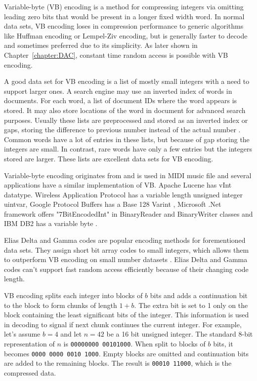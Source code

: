 Variable-byte (VB) encoding \citep{Wil99} is a method for compressing integers via omitting leading zero bits that would be present in a longer fixed 
width word. In normal data sets, VB encoding loses in compression performance to generic algorithms like Huffman encoding or Lempel-Ziv encoding, but 
is generally faster to decode \citep{Bri09} and sometimes preferred due to its simplicity. As later shown in Chapter~\ref{chapter:DAC}, constant time 
random access is possible with VB encoding.

A good data set for VB encoding is a list of mostly small integers with a need to support larger ones. A search engine may use an inverted index of 
words in documents. For each word, a list of document IDs where the word appears is stored. It may also store locations of the word in document for 
advanced search purposes. Usually these lists are preprocessed and stored as an inverted index or gaps, storing the difference to previous number 
instead of the actual number \citep{Man08}. Common words have a lot of entries in these lists, but because of gap storing the integers are small. 
In contrast, rare words have only a few entries but the integers stored are larger. These lists are excellent data sets for VB encoding. 

Variable-byte encoding originates from and is used in MIDI music file \citep{Mid96} and several applications have a similar implementation of VB. Apache 
Lucene has vInt datatype. Wireless Application Protocol has a variable length unsigned integer uintvar, Google Protocol Buffers has a Base 128 Varint \citep{GooPB},
 Microsoft .Net framework offers "7BitEncodedInt" in BinaryReader and BinaryWriter classes and IBM DB2 has a variable byte  \citep{Bha09}.

Elias Delta and Gamma codes \citep{Eli75} are popular encoding methods for forementioned data sets. They assign short bit array codes to small integers, 
which allows them to outperform VB encoding on small number datasets . Elias Delta and Gamma codes can't support fast random access efficiently because
of their changing code length.

VB encoding splits each integer into blocks of $b$ bits and adds a continuation bit to the block to form chunks of length $1+b$. The extra bit is set to 1 only
on the block containing the least significant bits of the integer. This information is used in decoding to signal if next chunk continues the current 
integer. For example, let's assume $b = 4$ and let $n = 42$ be a 16 bit unsigned integer. The standard 8-bit representation of $n$ is 
\texttt{00000000 00101000}. When split to blocks of $b$ bits, it becomes \texttt{0000 0000 0010 1000}. Empty blocks are omitted and continuation bits 
are added to the remaining blocks. The result is \texttt{00010 11000}, which is the compressed data.

